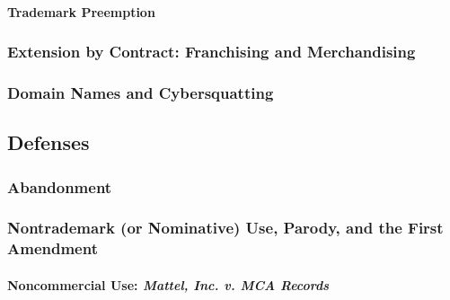 
\paragraph{Trademark Preemption}


\subsubsection{Extension by Contract: Franchising and Merchandising}


\subsubsection{Domain Names and Cybersquatting}


\subsection{Defenses}

\subsubsection{Abandonment}


\newpage %

\subsubsection{Nontrademark (or Nominative) Use, Parody, and the First 
Amendment}

\paragraph{Noncommercial Use: \emph{Mattel, Inc. v. MCA Records}}


